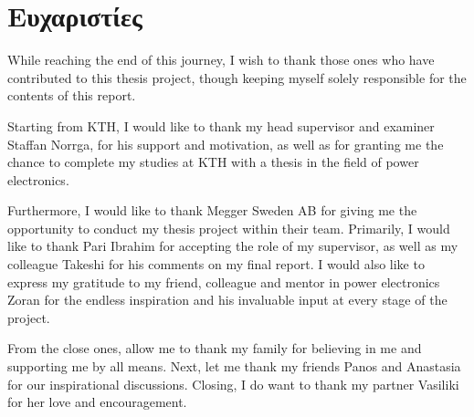 \section{Ευχαριστίες}

While reaching the end of this journey, I wish to thank those ones who have contributed to this thesis project, though keeping myself solely responsible for the contents of this report.

Starting from KTH, I would like to thank my head supervisor and examiner Staffan Norrga, for his support and motivation, as well as for granting me the chance to complete my studies at KTH with a thesis in the field of power electronics. 

Furthermore, I would like to thank Megger Sweden AB for giving me the opportunity to conduct my thesis project within their team. Primarily, I would like to thank Pari Ibrahim for accepting the role of my supervisor, as well as my colleague Takeshi for his comments on my final report. I would also like to express my gratitude to my friend, colleague and mentor in power electronics Zoran for the endless inspiration and his invaluable input at every stage of the project.

From the close ones, allow me to thank my family for believing in me and supporting me by all means. Next, let me thank my friends Panos and Anastasia for our inspirational discussions. Closing, I do want to thank my partner Vasiliki for her love and encouragement.
